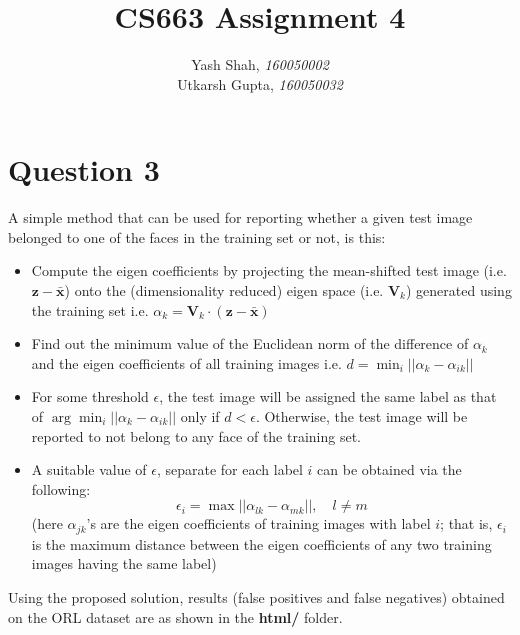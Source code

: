 \documentclass{article}
\title{CS663 Assignment 4}
\author{Yash Shah, \textit{160050002}\\Utkarsh Gupta, \textit{160050032}}
\begin{document}
	\maketitle
	\section*{Question 3}
	A simple method that can be used for reporting whether a given test image belonged to one of the faces in the training set or not, is this:
	\begin{itemize}
		\item Compute the eigen coefficients by projecting the mean-shifted test image (i.e. $\textbf{z} - \bar{\textbf{x}}$) onto the (dimensionality reduced) eigen space (i.e. $\textbf{V}_k$) generated using the training set i.e. $	\alpha_k = \textbf{V}_k\cdot\left( \textbf{z} - \bar{\textbf{x}}\right)$ 
		\item Find out the minimum value of the Euclidean norm of the difference of $\alpha_k$ and the eigen coefficients of all training images i.e. $d = \min_i ||\alpha_k - \alpha_{ik}||$
		\item For some threshold $\epsilon$, the test image will be assigned the same label as that of $\arg\min_i ||\alpha_k - \alpha_{ik}||$ only if $d<\epsilon$. Otherwise, the test image will be reported to not belong to any face of the training set.
		\item A suitable value of $\epsilon$, separate for each label $i$ can be obtained via the following:
		$$
		\epsilon_i = \max||\alpha_{lk} - \alpha_{mk}||,\hspace{1em} l\neq m
		$$
		(here $\alpha_{jk}$'s are the eigen coefficients of training images with label $i$; that is, $\epsilon_i$ is the maximum distance between the eigen coefficients of any two training images having the same label)
	\end{itemize}
Using the proposed solution, results (false positives and false negatives) obtained on the ORL dataset are as shown in the \textbf{html/} folder.
\end{document}
